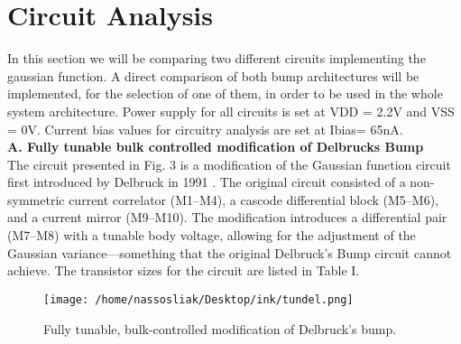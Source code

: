 \documentclass[conference]{IEEEtran}
\begin{document}
\section{\textbf{Circuit Analysis}}

In this section we will be comparing two different circuits implementing the gaussian function.  A direct comparison
of both bump architectures will be
implemented, for the selection of one of them, in order to
be used in the whole system architecture. Power supply for
all circuits is set at VDD = 2.2V and VSS = 0V. Current
bias values for circuitry analysis are set at Ibias= 65nA. \\

\textbf{A. Fully tunable bulk controlled modification of Delbrucks Bump} \\
The circuit presented in Fig. 3 is a modification of the Gaussian function circuit first introduced by Delbruck in 1991 \cite{155225}. The original circuit consisted of a non-symmetric current correlator (M1–M4), a cascode differential block (M5–M6), and a current mirror (M9–M10). The modification introduces a differential pair (M7–M8) with a tunable body voltage, allowing for the adjustment of the Gaussian variance—something that the original Delbruck's Bump circuit cannot achieve. The transistor sizes for the circuit are listed in Table I.

\begin{figure}[!h]
    \centering
    \texttt{[image: /home/nassosliak/Desktop/ink/tundel.png]}
    \caption{Fully tunable, bulk-controlled modification of
 Delbruck’s bump.}
    \label{fig:tundelfig}
\end{figure}
\end{document}
